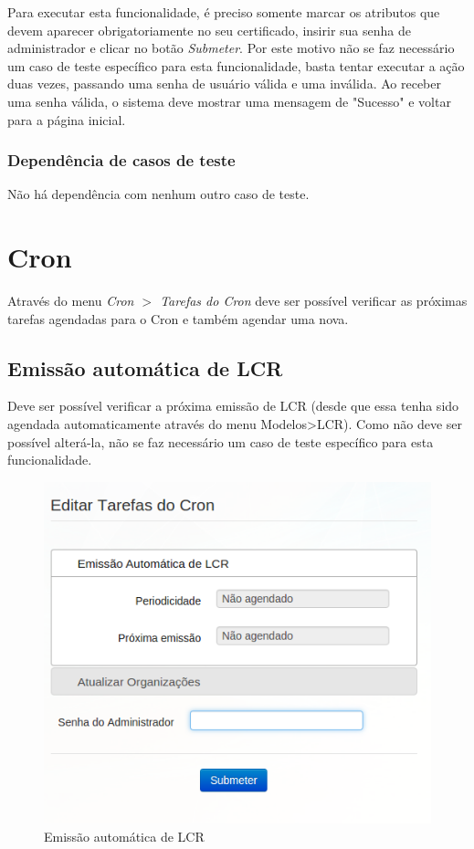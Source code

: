 Para executar esta funcionalidade, é preciso somente marcar os atributos que devem aparecer obrigatoriamente no seu certificado, insirir sua senha de administrador e clicar no botão \textit{Submeter}. Por este motivo não se faz necessário um  caso de teste específico para esta funcionalidade, basta tentar executar a ação duas vezes, passando uma senha de usuário válida e uma inválida. Ao receber uma senha válida, o sistema deve mostrar uma mensagem de "Sucesso" e voltar para a página inicial.

\subsubsection{Dependência de casos de teste}
Não há dependência com nenhum outro caso de teste.

\section{Cron}

Através do menu \textit{Cron $>$ Tarefas do Cron} deve ser possível verificar as próximas tarefas agendadas para o Cron e também agendar uma nova.

\subsection{Emissão automática de LCR}

Deve ser possível verificar a próxima emissão de LCR (desde que essa tenha sido agendada automaticamente através do menu Modelos>LCR). Como não deve ser possível alterá-la, não se faz necessário um  caso de teste específico para esta funcionalidade.

\begin{figure}[ht]
     \centering
     \includegraphics[scale=0.5]{images/saec21cron2.png}
     \caption{Emissão automática de LCR}
     \label{fig:cron}
\end{figure}

